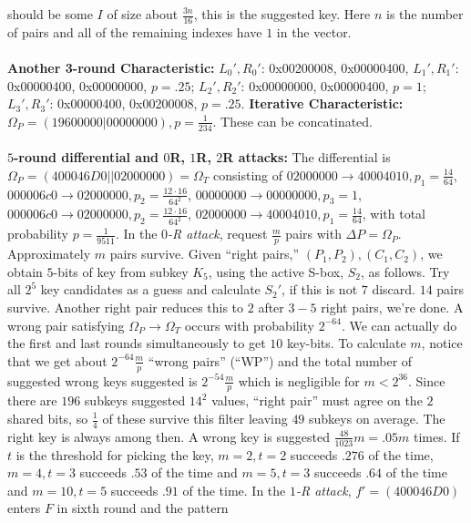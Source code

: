 should be some $I$ of size about ${\frac {3n} {16}}$, this is the
suggested key.  Here $n$ is the number of pairs and
all of the remaining indexes have $1$ in the vector.
\\
\\
{\bf Another 3-round Characteristic:}
$L_0 ' , R_0 '$: 0x00200008, 0x00000400,
$L_1 ' , R_1 '$: 0x00000400, 0x00000000, $p= .25$;
$L_2 ' , R_2 '$: 0x00000000, 0x00000400, $p= 1$;
$L_3 ' , R_3 '$: 0x00000400, 0x00200008, $p= .25$.
{\bf Iterative Characteristic:} $\Omega_P= (19 60 00 00 | 00 00 00 00), p= {\frac 1 {234}}$.
These can be concatinated.
\\
\\
{\bf $5$-round differential and $0$R, $1$R, $2$R attacks:}
The differential is
$\Omega_P= (40 00 46 D0 || 02 00 00 00)= \Omega_T$ consisting of
$02 00 00 00 \rightarrow 40 00 40 10, p_1= {\frac {14} {64}}$,
$00 00 06 c0 \rightarrow 02 00 00 00, p_2= {\frac {12 \cdot 16} {64^2}}$,
$00 00 00 00 \rightarrow 00 00 00 00, p_3= 1$,
$00 00 06 c0 \rightarrow 02 00 00 00, p_2= {\frac {12 \cdot 16} {64^2}}$,
$02 00 00 00 \rightarrow 40 00 40 10, p_1= {\frac {14} {64}}$, with total
probability $p= {\frac 1 {9511}}$.  
In the \emph{$0$-R attack}, 
request ${\frac m p}$ pairs with $\Delta P= \Omega_P$.
Approximately $m$ pairs survive.  Given ``right pairs,'' $(P_1, P_2), (C_1, C_2)$,
we obtain $5$-bits of key from subkey $K_5$, using the active S-box, $S_2$, as follows.
Try all $2^5$ key candidates as a guess and calculate $S_2'$, if this is not
$7$ discard.  $14$ pairs survive.  Another right pair reduces this to $2$ after
$3-5$ right pairs, we're done.  A wrong pair satisfying $\Omega_P \rightarrow \Omega_T$
occurs with probability $2^{-64}$.  We can actually do the 
first and last rounds simultaneously to get $10$ key-bits.  To calculate $m$,
notice that we get about $2^{-64} {\frac m p}$ ``wrong pairs'' (``WP'') and the
total number of suggested wrong keys suggested is $2^{-54} {\frac m p}$ which is
negligible for $m < 2^{36}$.  Since there are $196$ subkeys suggested
$14^2$ values, ``right pair'' must agree on the $2$ shared bits, so
${\frac 1 4}$ of these survive this filter leaving $49$ subkeys on average.  The right
key is always among then.  A wrong key is suggested ${\frac {48} {1023}}m = .05m$ times.
If $t$ is the threshold for picking the key, 
$m= 2, t=2$ succeeds $.276$ of the time,
$m= 4, t=3$ succeeds $.53$ of the time and
$m= 5, t=3$ succeeds $.64$ of the time and
$m= 10, t=5$ succeeds $.91$ of the time.
In the \emph{$1$-R attack}, $f'= (40 00 46 D0)$ enters $F$ in sixth round and the pattern
